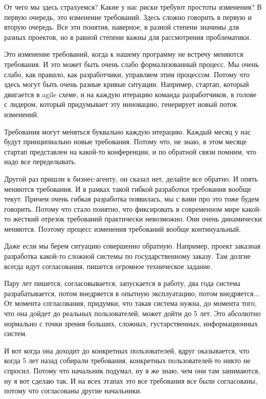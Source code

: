 От чего мы здесь страхуемся? Какие у нас риски требуют простоты изменения? В первую очередь, это изменение требований. Здесь сложно говорить в первую и вторую очередь. Все эти понятия, наверное, в разной степени значимы для разных проектов, но в равной степени важны для рассмотрения проблематики.

Это изменение требований, когда к нашему программу не встречу меняются требования. И это может быть очень слабо формализованный процесс. Мы очень слабо, как правило, как разработчики, управляем этим процессом. Потому что здесь могут быть очень разные кривые ситуации. Например, стартап, который двигается в agile схеме, и на каждую итерацию команда разработчиков, в голове с лидером, который придумывает эту инновацию, генерирует новый поток изменений. 

Требования могут меняться буквально каждую итерацию. Каждый месяц у нас будут принципиально новые требования. Потому что, не знаю, в этом месяце стартап представлен на какой-то конференции, и по обратной связи помним, что надо все переделывать.


Другой раз пришли к бизнес-агенту, он сказал нет, делайте все обратно. И опять меняются требования. И в рамках такой гибкой разработки требования вообще текут. Причем очень гибкая разработка появилась, мы с вами про это тоже будем говорить. Потому что стало понятно, что фиксировать в современном мире какой-то жесткий отрезок требований практически невозможно. Они очень динамически меняются. Поэтому процесс изменения требований вообще континуальный.

Даже если мы берем ситуацию совершенно обратную. Например, проект заказная разработка какой-то сложной системы по государственному заказу. Там долгие всегда идут согласования, пишется огромное техническое задание.

Пару лет пишется, согласовывается, запускается в работу, два года система разрабатывается, потом внедряется в опытную эксплуатацию, потом внедряется... От момента согласования, придумки, что такая система нужна, до момента того, что она дойдет до реальных пользователей, может дойти до 5 лет. Это абсолютно нормально с точки зрения больших, сложных, густарственных, информационных систем.

И вот когда она доходит до конкретных пользователей, вдруг оказывается, что когда 5 лет назад собирали требования, конкретных пользователей-то никто не спросил. Потому что начальник подумал, ну я же знаю, чем они там занимаются, ну я вот сделаю так. И на всех этапах это все требования все были согласованы, потому что согласованы другие начальники.

